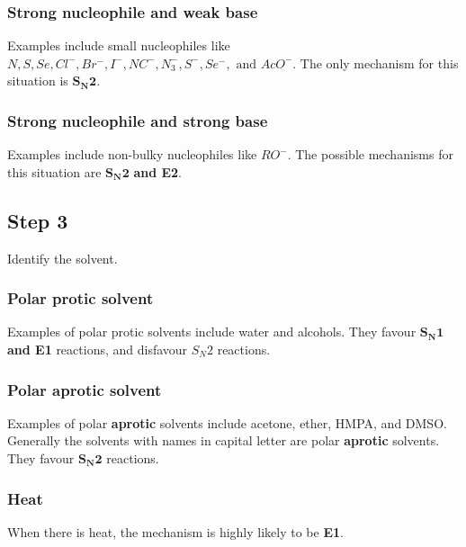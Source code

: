 \documentclass[11pt]{article}
\begin{document}
\subsubsection{Strong nucleophile and weak base}
\label{sec:org8b8e831}
Examples include small nucleophiles like \(N, S, Se, Cl^-, Br^-, I^-, NC^-, N_3^-, S^-, Se^-, \text{ and } AcO^-\). The only mechanism for this situation is \(\boldsymbol{S_N 2}\).

\subsubsection{Strong nucleophile and strong base}
\label{sec:orgb8962e9}
Examples include non-bulky nucleophiles like \(RO^-\). The possible mechanisms for this situation are \(\boldsymbol{S_N 2}\) \textbf{and E2}.

\subsection{Step 3}
\label{sec:org42db5af}
Identify the solvent.

\subsubsection{Polar protic solvent}
\label{sec:orgb37b747}
Examples of polar protic solvents include water and alcohols. They favour \(\boldsymbol{S_N 1}\) \textbf{and E1} reactions, and disfavour \(S_N 2\) reactions.

\subsubsection{Polar aprotic solvent}
\label{sec:org28c5997}
Examples of polar \textbf{aprotic} solvents include acetone, ether, HMPA, and DMSO. Generally the solvents with names in capital letter are polar \textbf{aprotic} solvents. They favour \(\boldsymbol{S_N 2}\) reactions.

\subsubsection{Heat}
\label{sec:org1478242}
When there is heat, the mechanism is highly likely to be \textbf{E1}.
\end{document}
